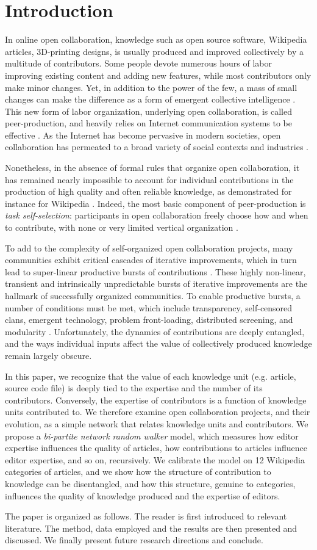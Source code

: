 \section{Introduction}
In online open collaboration, knowledge such as open source software, Wikipedia articles,  3D-printing designs, is usually produced and improved collectively by a multitude of contributors. Some people devote numerous hours of labor improving existing content and adding new features, while most contributors only make minor changes. Yet, in addition to the power of the few, a mass of small changes can make the difference as a form of emergent collective intelligence \cite{kittur2007power}.  This new form of labor organization, underlying open collaboration, is called peer-production, and heavily relies on Internet communication systems to be effective \cite{benkler2002}. As the Internet has become pervasive in modern societies, open collaboration has permeated to a broad variety of social contexts and industries \cite{benkler2011leviathan}. 

Nonetheless, in the absence of formal rules that organize open collaboration, it has remained nearly impossible to account for individual contributions in the production of high quality and often reliable knowledge, as demonstrated for instance for Wikipedia \cite{giles2005internet}. Indeed, the most basic component of peer-production is {\it task self-selection}: participants in open collaboration freely choose how and when to contribute, with none or very limited vertical organization \cite{benkler2002}.

To add to the complexity of self-organized open collaboration projects, many communities exhibit critical cascades of iterative improvements, which in turn lead to super-linear productive bursts of contributions \cite{sornette2014howmuch}. These highly non-linear, transient and intrinsically unpredictable bursts of iterative improvements are the hallmark of successfully organized communities. To enable productive bursts, a number of conditions must be met, which include transparency, self-censored clans, emergent technology, problem front-loading, distributed screening, and modularity \cite{vonkrogh2014designing}. Unfortunately, the dynamics of contributions are deeply entangled, and the ways individual inputs affect the value of collectively produced knowledge remain largely obscure. 

In this paper, we recognize that the value of each knowledge unit (e.g. article, source code file) is deeply tied to the expertise and the number of its contributors. Conversely, the expertise of contributors is a function of knowledge units contributed to. We therefore examine open collaboration projects, and their evolution, as a simple network that relates knowledge units and contributors. We propose a {\it bi-partite network random walker} model, which measures how editor expertise influences the quality of articles, how contributions to articles influence editor expertise, and so on, recursively. We calibrate the model on 12 Wikipedia categories of articles, and we show how the structure of contribution to knowledge can be disentangled, and how this structure, genuine to categories, influences the quality of knowledge produced and the expertise of editors.

The paper is organized as follows. The reader is first introduced to relevant literature. The method, data employed and the results are then presented and discussed. We finally present future research directions and conclude.
